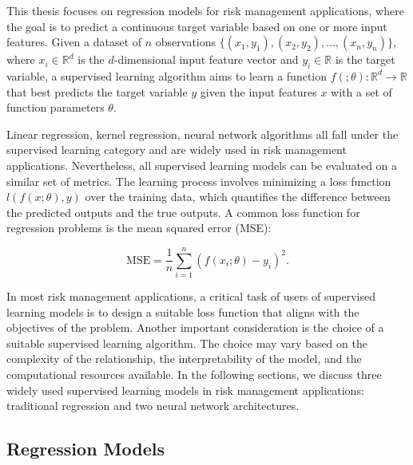 This thesis focuses on regression models for risk management applications, where the goal is to predict a continuous target variable based on one or more input features.
Given a dataset of $n$ observations $\{(x_1, y_1), (x_2, y_2), \ldots, (x_n, y_n)\}$, where $x_i \in \mathbb{R}^d$ is the $d$-dimensional input feature vector and $y_i \in \mathbb{R}$ is the target variable, a supervised learning algorithm aims to learn a function $f(;\theta): \mathbb{R}^d \rightarrow \mathbb{R}$ that best predicts the target variable $y$ given the input features $x$ with a set of function parameters $\theta$.

Linear regression, kernel regression, neural network algorithms all fall under the supervised learning category and are widely used in risk management applications.
Nevertheless, all supervised learning models can be evaluated on a similar set of metrics.
The learning process involves minimizing a loss function $l(f(x; \theta),y)$ over the training data, which quantifies the difference between the predicted outputs and the true outputs. 
A common loss function for regression problems is the mean squared error (MSE):

\begin{equation}
    \text{MSE} = \frac{1}{n} \sum_{i=1}^{n} (f(x_i;\theta) - y_i)^2.
\end{equation}

In most risk management applications, a critical task of users of supervised learning models is to design a suitable loss function that aligns with the objectives of the problem.
Another important consideration is the choice of a suitable supervised learning algorithm.
The choice may vary based on the complexity of the relationship, the interpretability of the model, and the computational resources available.
In the following sections, we discuss three widely used supervised learning models in risk management applications: traditional regression and two neural network architectures.

\subsection{Regression Models}

